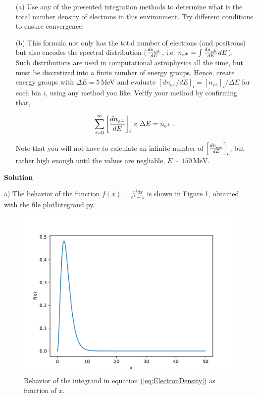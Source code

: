 \documentclass[11pt]{article}
\begin{document}
\begin{enumerate}
\item[(a)] Use any of the presented integration methods to determine what
  is the total number density of electrons in this environment. Try different conditions to ensure convergence. 

\item[(b)] This formula not only has the total number of
  electrons (and positrons) but also encodes the spectral distribution
  (${dn_{e^\pm} \over dE}$, i.e. $n_{e^\pm} = \int {dn_{e^\pm}\over
    dE} dE$).\\
  Such distributions are used in computational
  astrophysics all the time, but must be discretized into a finite
  number of energy groups. Hence, create energy groups with $\Delta E =
  5\,$MeV and evaluate $[dn_{e^\pm}/dE]_i = [n_{e^\pm}]_i / \Delta E$
  for each bin $i$, using any method you like. Verify your
  method by confirming that,

\begin{equation}
\sum_{i=0}^{\infty}\left[{dn_{e^\pm}\over
    dE}\right]_i \times \Delta E = n_{e^\pm}\,.
\end{equation}

Note that you will not have to calculate an infinite number of $\left[{dn_{e^\pm}\over
    dE}\right]_i$, but rather high enough until
the values are negliable, $E \sim 150\,\mathrm{MeV}$. \newline

\end{enumerate}

\textbf{Solution}

a) The behavior of the function $f(x) = \frac{x^2 dx}{e^{x} + 1}$ is shown in Figure \ref{fig:plotIntegrand}, obtained with the file plotIntegrand.py. 

\begin{figure}
\centering
\includegraphics[scale=0.5]{plotIntegrand.pdf}
\caption{Behavior of the integrand in equation (\ref{eq:ElectronDensity}) as function of $x$.}
\label{fig:plotIntegrand}
\end{figure}
\end{document}
